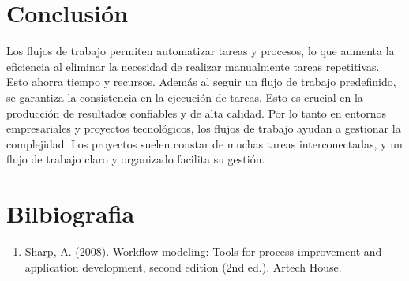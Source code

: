 \documentclass{dense_template}
\begin{document}
\section{Conclusión}
Los flujos de trabajo permiten automatizar tareas y procesos, lo que aumenta la eficiencia al eliminar la necesidad de realizar manualmente tareas repetitivas. Esto ahorra tiempo y recursos. Además al seguir un flujo de trabajo predefinido, se garantiza la consistencia en la ejecución de tareas. Esto es crucial en la producción de resultados confiables y de alta calidad. Por lo tanto en entornos empresariales y proyectos tecnológicos, los flujos de trabajo ayudan a gestionar la complejidad. Los proyectos suelen constar de muchas tareas interconectadas, y un flujo de trabajo claro y organizado facilita su gestión.

\pagebreak
\section{Bilbiografia}
\sloppy
\begin{enumerate}
    \item Sharp, A. (2008). Workflow modeling: Tools for process improvement and application development, second edition (2nd ed.). Artech House.
\end{enumerate}
\end{document}
